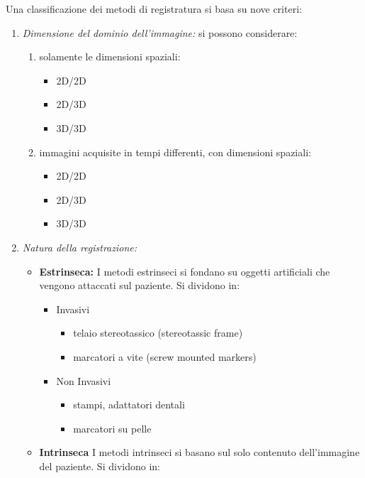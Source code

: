 Una classificazione dei metodi di registratura si basa su nove criteri:

\begin{enumerate}
    \item \textit{Dimensione del dominio dell'immagine:}
          si possono considerare:
          \begin{enumerate}
              \item solamente le dimensioni spaziali:
                    \begin{itemize}
                        \item 2D/2D
                        \item 2D/3D
                        \item 3D/3D
                    \end{itemize}
              \item immagini acquisite in tempi differenti, con dimensioni spaziali:
                    \begin{itemize}
                        \item 2D/2D
                        \item 2D/3D
                        \item 3D/3D
                    \end{itemize}
          \end{enumerate}
    \item \textit{Natura della registrazione:}
          \begin{itemize}
              \item \textbf{Estrinseca:}
                    I metodi estrinseci si fondano su oggetti artificiali che vengono attaccati sul paziente. Si dividono in:
                    \begin{itemize}
                        \item Invasivi
                              \begin{itemize}
                                  \item telaio stereotassico (stereotassic frame)
                                  \item marcatori a vite (screw mounted markers)
                              \end{itemize}
                        \item Non Invasivi
                              \begin{itemize}
                                  \item stampi, adattatori dentali
                                  \item marcatori su pelle
                              \end{itemize}
                    \end{itemize}
              \item \textbf{Intrinseca}
                    I metodi intrinseci si basano sul solo contenuto dell'immagine del paziente. Si dividono in:


\end{itemize}
\end{enumerate}
